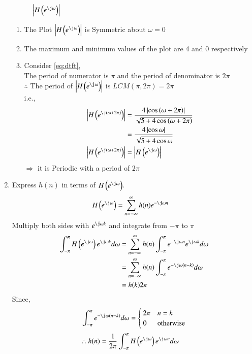 \documentclass[journal,12pt,twocolumn]{IEEEtran}
\renewcommand\thesection{\arabic{section}}
\begin{document}
\begin{enumerate}[label=\thesection.\arabic*]
\begin{figure}[!htbp]
\caption{$\abs{H\brak{e^{\j\omega}}}$}
\label{fig:dtft}
\end{figure}
\begin{enumerate}
\item The Plot $\abs{H\brak{e^{\j\omega}}}$ is Symmetric about $\omega = 0$
\item The maximum and minimum values of the plot are 4 and 0 respectively 
\item Consider \eqref{eq:dtft},\\
The period of numerator is $\pi$ and the period of denominator is $2\pi$\\
$\therefore$ The period of $\abs{H\brak{e^{\j\omega}}}$ is $LCM(\pi,2\pi) = 2\pi$\\
i.e.,
\begin{align}
\abs{H\brak{e^{\j\brak{\omega + 2\pi}}}} &= \frac{4\abs{\cos\brak{\omega + 2\pi}}}{\sqrt{5+4\cos\brak{\omega + 2\pi}}}\\ &= \frac{4\abs{\cos{\omega}}}{\sqrt{5+4\cos{\omega}}}\\ \abs{H\brak{e^{\j\brak{\omega + 2\pi}}}} &= \abs{H\brak{e^{\j\omega}}}
\end{align}
$\Rightarrow$ it is Periodic with a period of $2\pi$
\end{enumerate}
\item Express $h(n)$ in terms of $H\brak{e^{\j \omega}}$.\\
\solution 
\begin{align}
H\brak{e^{\j\omega}} &= \sum_{n=-\infty}^{\infty}h(n)e^{-\j \omega n}
\end{align}
Multiply both sides with $e^{\j \omega k}$ and integrate from $-\pi$ to $\pi$
\begin{align}
\int_{-\pi}^{\pi}H\brak{e^{\j\omega}}e^{\j \omega k} d\omega &= \sum_{n=-\infty}^{\infty}h(n)\int_{-\pi}^{\pi}e^{-\j \omega n}e^{\j \omega k} d\omega\\ &= \sum_{n=-\infty}^{\infty}h(n)\int_{-\pi}^{\pi}e^{-\j \omega\brak{n-k}} d\omega\\ &= h(k)2\pi
\end{align}
Since,
\begin{align}
\int_{-\pi}^{\pi}e^{-\j\omega(n - k)}d\omega =
	\begin{cases}
		2\pi & n = k \\
		0 & \textrm{otherwise}
	\end{cases}
\end{align}
\begin{align}
\therefore h(n) &= \frac{1}{2\pi}\int_{-\pi}^{\pi}H\brak{e^{\j\omega}}e^{\j \omega n} d\omega
\end{align}
\end{enumerate}
\end{document}

